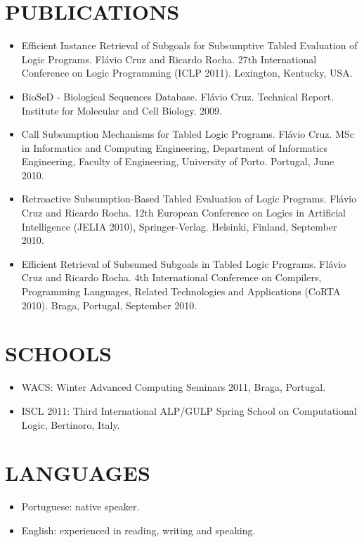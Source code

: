 \documentclass[margin]{res}
\begin{document}
\begin{resume}
\section{PUBLICATIONS}
\begin{itemize}
      \item Efficient Instance Retrieval of Subgoals for Subsumptive Tabled Evaluation of Logic Programs. Flávio Cruz and Ricardo Rocha. 27th International Conference on Logic Programming (ICLP 2011). Lexington, Kentucky, USA.
      \item BioSeD - Biological Sequences Database. Flávio Cruz. Technical Report. Institute for Molecular and Cell Biology. 2009.
      \item Call Subsumption Mechanisms for Tabled Logic Programs. Flávio Cruz. MSc in Informatics and Computing Engineering, Department of Informatics Engineering, Faculty of Engineering, University of Porto. Portugal, June 2010.
      \item Retroactive Subsumption-Based Tabled Evaluation of Logic Programs.
      Flávio Cruz and Ricardo Rocha. 12th European Conference on Logics in Artificial Intelligence (JELIA 2010), Springer-Verlag. Helsinki, Finland, September 2010.
      \item Efficient Retrieval of Subsumed Subgoals in Tabled Logic Programs.
      Flávio Cruz and Ricardo Rocha. 4th International Conference on Compilers, Programming Languages, Related Technologies and Applications (CoRTA 2010). Braga, Portugal, September 2010.
   \end{itemize}

\section{SCHOOLS}
   \begin{itemize}
      \item WACS: Winter Advanced Computing Seminars 2011, Braga, Portugal.
      \item ISCL 2011: Third International ALP/GULP Spring School on Computational Logic, Bertinoro, Italy.
   \end{itemize}

\section{LANGUAGES}
      \begin{itemize}
        \item Portuguese: native speaker.
        \item English: experienced in reading, writing and speaking.
      \end{itemize}


\end{resume}
\end{document}
